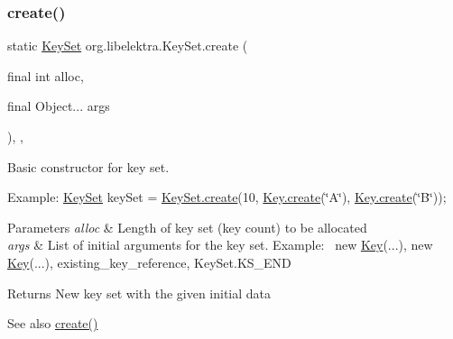\subsubsection{\texorpdfstring{create()}{create()}\hspace{0.1cm}{\footnotesize\ttfamily [1/3]}}
{\footnotesize\ttfamily static \hyperlink{classorg_1_1libelektra_1_1KeySet}{Key\+Set} org.\+libelektra.\+Key\+Set.\+create (\begin{DoxyParamCaption}\item[{final int}]{alloc,  }\item[{final Object...}]{args }\end{DoxyParamCaption})\hspace{0.3cm}{\ttfamily [inline]}, {\ttfamily [static]}, {\ttfamily [protected]}}



Basic constructor for key set. 

Example\+: \hyperlink{classorg_1_1libelektra_1_1KeySet}{Key\+Set} key\+Set = \hyperlink{classorg_1_1libelektra_1_1KeySet_ae3f1cd9ac1a4fd2ef7d16e6c320bc6a3}{Key\+Set.\+create}(10, \hyperlink{classorg_1_1libelektra_1_1Key_af407cf43625618af4e7fb2576037fcfc}{Key.\+create}(\char`\"{}\+A\char`\"{}), \hyperlink{classorg_1_1libelektra_1_1Key_af407cf43625618af4e7fb2576037fcfc}{Key.\+create}(\char`\"{}\+B\char`\"{}));


\begin{DoxyParams}{Parameters}
{\em alloc} & Length of key set (key count) to be allocated \\
\hline
{\em args} & List of initial arguments for the key set. Example\+:~\newline
 new \hyperlink{classorg_1_1libelektra_1_1Key}{Key}(...), new \hyperlink{classorg_1_1libelektra_1_1Key}{Key}(...), existing\+\_\+key\+\_\+reference, Key\+Set.\+K\+S\+\_\+\+E\+ND \\
\hline
\end{DoxyParams}
\begin{DoxyReturn}{Returns}
New key set with the given initial data 
\end{DoxyReturn}
\begin{DoxySeeAlso}{See also}
\hyperlink{classorg_1_1libelektra_1_1KeySet_ac0ba4b88bef5e731b586f4ca63b9ab7f}{create()} 
\end{DoxySeeAlso}
\mbox{\label{classorg_1_1libelektra_1_1KeySet_ac0ba4b88bef5e731b586f4ca63b9ab7f}} 
